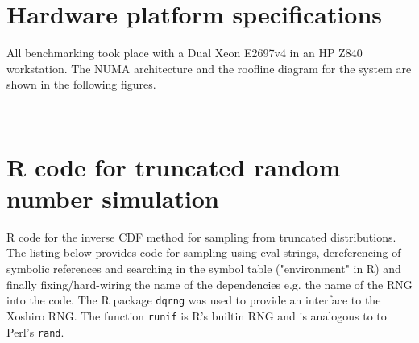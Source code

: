 \documentclass[10pt]{article}
\begin{document}
\newpage

\newpage
\begin{appendices}
\section{Hardware platform specifications}
All benchmarking took place with a Dual Xeon E2697v4 in an HP Z840 workstation. The NUMA architecture and the roofline diagram for the system are shown in the following figures.
\begin{figure}[H]
\renewcommand{\figurename}{Figure A}
  \centering
   \\
\end{figure}
\newpage

\section{R code for truncated random number simulation}\label{apndx:RNGCodeInR} 
R code for the inverse CDF method for sampling from truncated distributions. The listing below provides code for sampling using eval strings, dereferencing of symbolic references and searching in the symbol table ("environment" in R) and finally fixing/hard-wiring the name of the dependencies e.g. the name of the RNG into the code. The R package \texttt{dqrng} was used to provide an interface to the Xoshiro RNG. The function \texttt{runif} is R's builtin RNG and is analogous to to Perl's \texttt{rand}.


\end{appendices}
\end{document}
